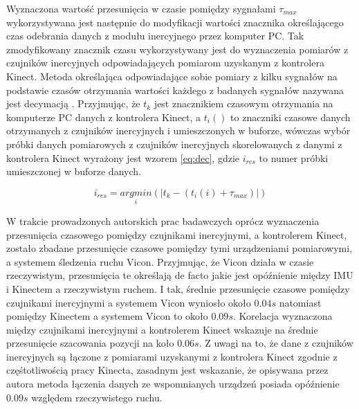 Wyznaczona wartość przesunięcia w czasie pomiędzy sygnałami $\tau_{max}$ wykorzystywana jest następnie do modyfikacji wartości znacznika określającego czas odebrania danych z modułu inercyjnego przez komputer PC. Tak zmodyfikowany znacznik czasu wykorzystywany jest do wyznaczenia pomiarów z czujników inercyjnych odpowiadających pomiarom uzyskanym z kontrolera Kinect. Metoda określająca odpowiadające sobie pomiary z kilku sygnałów na podstawie czasów otrzymania wartości każdego z badanych sygnałów nazywana jest decymacją \cite{Hinton2001}.
Przyjmując, że $t_k$ jest znacznikiem czasowym otrzymania na komputerze PC danych z kontrolera Kinect, a $t_i()$ to znaczniki czasowe danych  otrzymanych z czujników inercyjnych i umieszczonych w buforze, wówczas wybór próbki danych pomiarowych z czujników inercyjnych skorelowanych z danymi z kontrolera Kinect wyrażony jest wzorem \eqref{eq:dec}, gdzie $i_{res}$ to numer próbki umieszczonej w buforze danych.

\begin{equation}
	i_{res} = \underset{i}{argmin}(|t_k-(t_i(i) + \tau_{max})|)
	\label{eq:dec}
\end{equation}

W trakcie prowadzonych autorskich prac badawczych oprócz wyznaczenia przesunięcia czasowego pomiędzy czujnikami inercyjnymi, a kontrolerem Kinect, zostało zbadane przesunięcie czasowe pomiędzy tymi urządzeniami pomiarowymi, a systemem śledzenia ruchu Vicon. Przyjmując, że Vicon działa w czasie rzeczywistym, przesunięcia te określają de facto jakie jest opóźnienie między IMU i Kinectem a rzeczywistym ruchem. I tak, średnie przesunięcie czasowe pomiędzy czujnikami inercyjnymi a systemem Vicon wyniosło około $0.04s$ natomiast pomiędzy Kinectem a systemem Vicon to około $0.09s$. Korelacja wyznaczona między czujnikami inercyjnymi a kontrolerem Kinect wskazuje na średnie przesunięcie szacowania pozycji na koło $0.06s$. Z uwagi na to, że dane z czujników inercyjnych są łączone z pomiarami uzyskanymi z kontrolera Kinect zgodnie z częśtotliwością pracy Kinecta, zasadnym jest wskazanie, że opisywana przez autora metoda łączenia danych ze wspomnianych urządzeń posiada opóźnienie $0.09s$ względem rzeczywistego ruchu.

